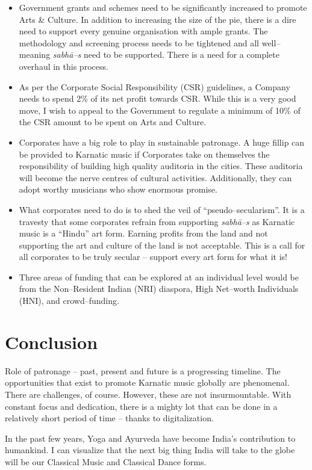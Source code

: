 \begin{itemize}
 \item Government grants and schemes need to be significantly increased to promote Arts \& Culture. In addition to increasing the size of the pie, there is a dire need to support every genuine organisation with ample grants. The methodology and screening process needs to be tightened and all well–meaning \textit{sabhā–s} need to be supported. There is a need for a complete overhaul in this process.

 \item As per the Corporate Social Responsibility (CSR) guidelines, a Company needs to spend 2\% of its net profit towards CSR. While this is a very good move, I wish to appeal to the Government to regulate a minimum of 10\% of the CSR amount to be spent on Arts and Culture.

 \item Corporates have a big role to play in sustainable patronage. A huge fillip can be provided to Karnatic music if Corporates take on themselves the responsibility of building high quality auditoria in the cities. These auditoria will become the nerve centres of cultural activities. Additionally, they can adopt worthy musicians who show enormous promise.

 \item What corporates need to do is to shed the veil of “pseudo–secularism”. It is a travesty that some corporates refrain from supporting \textit{sabhā–s} as Karnatic music is a “Hindu” art form. Earning profits from the land and not supporting the art and culture of the land is not acceptable. This is a call for all corporates to be truly secular – support every art form for what it is!

 \item Three areas of funding that can be explored at an individual level would be from the Non–Resident Indian (NRI) diaspora, High Net–worth Individuals (HNI), and crowd–funding.

\end{itemize}


\section*{Conclusion}

Role of patronage – past, present and future is a progressing timeline. The opportunities that exist to promote Karnatic music globally are phenomenal. There are challenges, of course. However, these are not insurmountable. With constant focus and dedication, there is a mighty lot that can be done in a relatively short period of time – thanks to digitalization.

In the past few years, Yoga and Ayurveda have become India’s contribution to humankind. I can visualize that the next big thing India will take to the globe will be our Classical Music and Classical Dance forms.

\theendnotes

